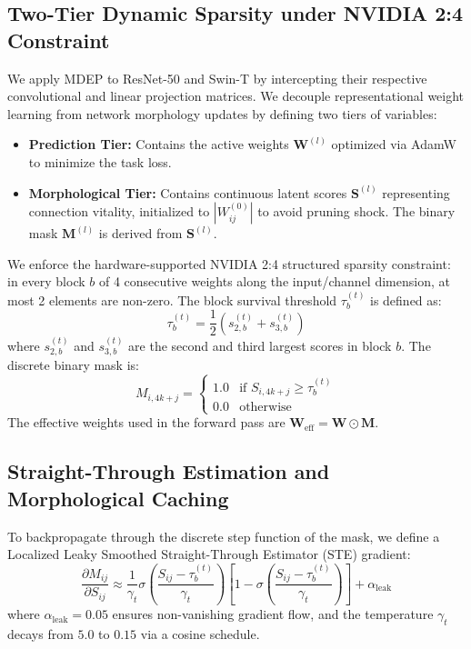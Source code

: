 \documentclass[letterpaper]{article} %
\begin{document}
\subsection{Two-Tier Dynamic Sparsity under NVIDIA 2:4 Constraint}
We apply MDEP to ResNet-50 and Swin-T by intercepting their respective convolutional and linear projection matrices. We decouple representational weight learning from network morphology updates by defining two tiers of variables:
\begin{itemize}
    \item \textbf{Prediction Tier:} Contains the active weights $\bm{W}^{(l)}$ optimized via AdamW to minimize the task loss.
    \item \textbf{Morphological Tier:} Contains continuous latent scores $\bm{S}^{(l)}$ representing connection vitality, initialized to $|W_{ij}^{(0)}|$ to avoid pruning shock. The binary mask $\bm{M}^{(l)}$ is derived from $\bm{S}^{(l)}$.
\end{itemize}
We enforce the hardware-supported NVIDIA 2:4 structured sparsity constraint: in every block $b$ of 4 consecutive weights along the input/channel dimension, at most 2 elements are non-zero. The block survival threshold $\tau_b^{(t)}$ is defined as:
\begin{equation}\label{eq:tau}
    \tau_b^{(t)} = \frac{1}{2} \left(s_{2,b}^{(t)} + s_{3,b}^{(t)}\right)
\end{equation}
where $s_{2,b}^{(t)}$ and $s_{3,b}^{(t)}$ are the second and third largest scores in block $b$. The discrete binary mask is:
\begin{equation}\label{eq:mask}
    M_{i, 4k+j} = \begin{cases}
        1.0 & \text{if } S_{i, 4k+j} \ge \tau_b^{(t)} \\
        0.0 & \text{otherwise}
    \end{cases}
\end{equation}
The effective weights used in the forward pass are $\bm{W}_{\text{eff}} = \bm{W} \odot \bm{M}$.

\subsection{Straight-Through Estimation and Morphological Caching}
To backpropagate through the discrete step function of the mask, we define a Localized Leaky Smoothed Straight-Through Estimator (STE) gradient:
\begin{equation}\label{eq:ste_grad}
    \frac{\partial M_{ij}}{\partial S_{ij}} \approx \frac{1}{\gamma_t} \sigma\!\left(\frac{S_{ij} - \tau_b^{(t)}}{\gamma_t}\right) \left[1 - \sigma\!\left(\frac{S_{ij} - \tau_b^{(t)}}{\gamma_t}\right)\right] + \alpha_{\text{leak}}
\end{equation}
where $\alpha_{\text{leak}} = 0.05$ ensures non-vanishing gradient flow, and the temperature $\gamma_t$ decays from $5.0$ to $0.15$ via a cosine schedule.
\end{document}
